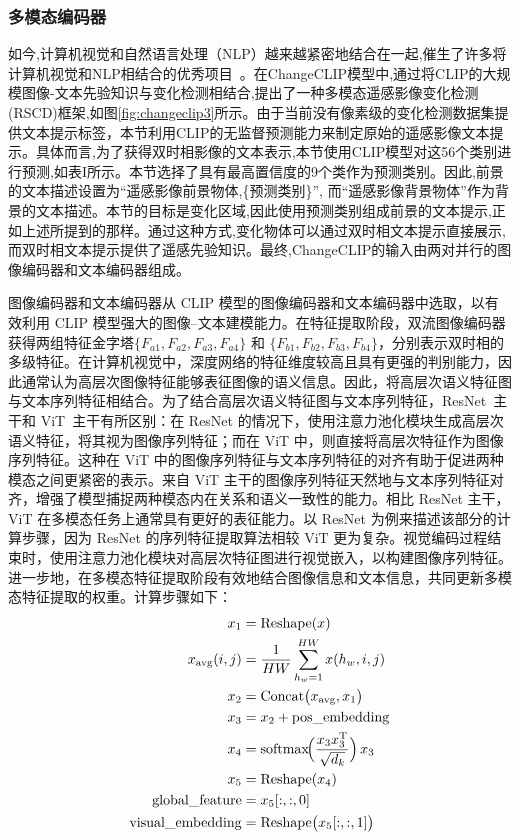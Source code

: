\subsubsection{多模态编码器}
如今,计算机视觉和自然语言处理（NLP）越来越紧密地结合在一起,催生了许多将计算机视觉和NLP相结合的优秀项目~\cite{Chen2021VisualGPTDA, Lu2019ViLBERTPT}。在ChangeCLIP模型中,通过将CLIP的大规模图像-文本先验知识与变化检测相结合,提出了一种多模态遥感影像变化检测(RSCD)框架,如图\ref{fig:changeclip3}所示。由于当前没有像素级的变化检测数据集提供文本提示标签，本节利用CLIP的无监督预测能力来制定原始的遥感影像文本提示。具体而言,为了获得双时相影像的文本表示,本节使用CLIP模型对这56个类别进行预测,如表I所示。本节选择了具有最高置信度的9个类作为预测类别。因此,前景的文本描述设置为``遥感影像前景物体,\{预测类别\}'', 而``遥感影像背景物体''作为背景的文本描述。本节的目标是变化区域,因此使用预测类别组成前景的文本提示,正如上述所提到的那样。通过这种方式,变化物体可以通过双时相文本提示直接展示,而双时相文本提示提供了遥感先验知识。最终,ChangeCLIP的输入由两对并行的图像编码器和文本编码器组成。

图像编码器和文本编码器从 CLIP 模型的图像编码器和文本编码器中选取，以有效利用 CLIP 模型强大的图像–文本建模能力。在特征提取阶段，双流图像编码器获得两组特征金字塔$\{F_{a1},F_{a2},F_{a3},F_{a4}\}$ 和 $\{F_{b1},F_{b2},F_{b3},F_{b4}\}$，分别表示双时相的多级特征。在计算机视觉中，深度网络的特征维度较高且具有更强的判别能力，因此通常认为高层次图像特征能够表征图像的语义信息。因此，将高层次语义特征图与文本序列特征相结合。为了结合高层次语义特征图与文本序列特征，ResNet~\cite{He2015DeepRL}主干和 ViT~\cite{Dosovitskiy2020AnII}主干有所区别：在 ResNet 的情况下，使用注意力池化模块生成高层次语义特征，将其视为图像序列特征；而在 ViT 中，则直接将高层次特征作为图像序列特征。这种在 ViT 中的图像序列特征与文本序列特征的对齐有助于促进两种模态之间更紧密的表示。来自 ViT 主干的图像序列特征天然地与文本序列特征对齐，增强了模型捕捉两种模态内在关系和语义一致性的能力。相比 ResNet 主干，ViT 在多模态任务上通常具有更好的表征能力。以 ResNet 为例来描述该部分的计算步骤，因为 ResNet 的序列特征提取算法相较 ViT 更为复杂。视觉编码过程结束时，使用注意力池化模块对高层次特征图进行视觉嵌入，以构建图像序列特征。进一步地，在多模态特征提取阶段有效地结合图像信息和文本信息，共同更新多模态特征提取的权重。计算步骤如下：
\begin{align}
x_1 &= \mathrm{Reshape}(x) \label{eq:changeclip-1}\\
x_{\mathrm{avg}}(i,j) &= \frac{1}{HW}\sum_{h_w=1}^{HW} x(h_w, i, j) \label{eq:changeclip-2}\\
x_2 &= \mathrm{Concat}\bigl(x_{\mathrm{avg}}, x_1\bigr) \label{eq:changeclip-3}\\
x_3 &= x_2 + \mathrm{pos\_embedding} \label{eq:changeclip-4}\\
x_4 &= \mathrm{softmax}\!\Bigl(\frac{x_3 x_3^{\mathrm{T}}}{\sqrt{d_k}}\Bigr)\,x_3 \label{eq:changeclip-5}\\
x_5 &= \mathrm{Reshape}(x_4) \label{eq:changeclip-6}\\
\mathrm{global\_feature} &= x_5[:,:,0] \label{eq:changeclip-7}\\
\mathrm{visual\_embedding} &= \mathrm{Reshape}\bigl(x_5[:,:,1]\bigr) \label{eq:changeclip-8}
\end{align}

